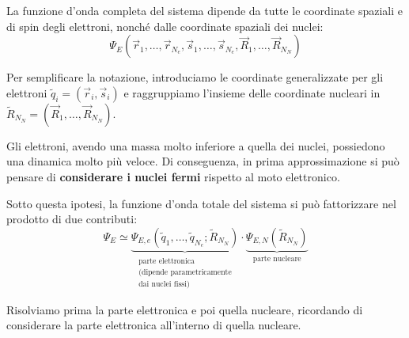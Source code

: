 La funzione d'onda completa del sistema dipende da tutte le coordinate spaziali e di spin degli elettroni, nonché dalle coordinate spaziali dei nuclei:
\begin{equation}
    \Psi_E(\vec{r}_1, \dots, \vec{r}_{N_e}, \vec{s}_1, \dots, \vec{s}_{N_e}, \vec{R}_1, \dots, \vec{R}_{N_N})
\end{equation}

Per semplificare la notazione, introduciamo le coordinate generalizzate per gli elettroni \( \tilde{q}_i = (\vec{r}_i, \vec{s}_i) \) e raggruppiamo l'insieme delle coordinate nucleari in \( \tilde{R}_{N_N} = (\vec{R}_1, \dots, \vec{R}_{N_N}) \).

Gli elettroni, avendo una massa molto inferiore a quella dei nuclei, possiedono una dinamica molto più veloce. Di conseguenza, in prima approssimazione si può pensare di \textbf{considerare i nuclei fermi} rispetto al moto elettronico. 

Sotto questa ipotesi, la funzione d'onda totale del sistema si può fattorizzare nel prodotto di due contributi:
\begin{equation}
    \Psi_E \simeq \underbrace{\Psi_{E,e}(\tilde{q}_1, \dots, \tilde{q}_{N_e} ; \tilde{R}_{N_N})}_{\substack{\text{parte elettronica} \\ \text{(dipende parametricamente} \\ \text{dai nuclei fissi)}}} \cdot \underbrace{\Psi_{E,N}(\tilde{R}_{N_N})}_{\text{parte nucleare}}
\end{equation}

Risolviamo prima la parte elettronica e poi quella nucleare, ricordando di considerare la parte elettronica all'interno di quella nucleare.

